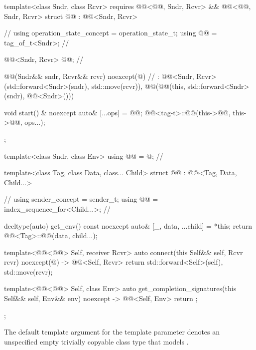 \begin{codeblock}
{  template<class Sndr, class Rcvr>
    requires @@<@@, Sndr, Rcvr> &&
             @@<@@, Sndr, Rcvr>
  struct @@ : @@<Sndr, Rcvr> {                // \expos
    using operation_state_concept = operation_state_t;
    using @@ = tag_of_t<Sndr>;                               // \expos

    @@<Sndr, Rcvr> @@;              // \expos

    @@(Sndr&& sndr, Rcvr&& rcvr) noexcept(@\seebelow@)  // \expos
      : @@<Sndr, Rcvr>(std::forward<Sndr>(sndr), std::move(rcvr)),
        @@(@@(this, std::forward<Sndr>(sndr), @@<Sndr>()))
    {}

    void start() & noexcept {
      auto& [...ops] = @@;
      @@<tag-t>::@@(this->@@, this->@@, ops...);
    }
  };

  template<class Sndr, class Env>
  using @@ = @\seebelow@;                   // \expos

  template<class Tag, class Data, class... Child>
  struct @@ : @@<Tag, Data, Child...> {    // \expos
    using sender_concept = sender_t;
    using @@ = index_sequence_for<Child...>;       // \expos

    decltype(auto) get_env() const noexcept {
      auto& [_, data, ...child] = *this;
      return @@<Tag>::@@(data, child...);
    }

    template<@@<@@> Self, receiver Rcvr>
    auto connect(this Self&& self, Rcvr rcvr) noexcept(@\seebelow@)
      -> @@<Self, Rcvr> {
      return {std::forward<Self>(self), std::move(rcvr)};
    }

    template<@@<@@> Self, class Env>
    auto get_completion_signatures(this Self&& self, Env&& env) noexcept
      -> @@<Self, Env> {
      return {};
    }
  };
}
\end{codeblock}

\pnum
The default template argument for the  template parameter
denotes an unspecified empty trivially copyable class type
that models .

